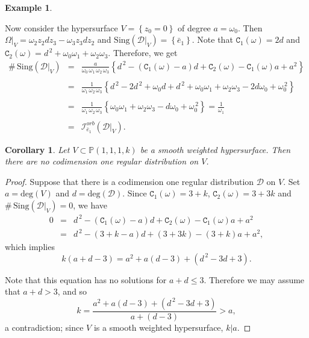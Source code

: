 \documentclass[11pt]{amsart}
\theoremstyle{plain}
\newtheorem{cor}{Corollary}[section]
\theoremstyle{definition}
\newtheorem{exe}{Example}[section]
\begin{document}
\begin{exe}
\begin{enumerate}
Now consider the hypersurface $V=\left\{z_0=0\right\}$ of degree $a=\omega_0$. 
Then $\Omega|_V=\omega_2z_2dz_3-\omega_3z_3dz_2$ and $\mathrm{Sing}(\mathcal{D}|_V)=\left\{\bar{e}_1\right\}$.
Note that $\texttt{C}_1(\omega)=2d$ and $\texttt{C}_2(\omega)=d^{\,2}+\omega_0\omega_1+\omega_2\omega_3$.
Therefore, we get
\begin{eqnarray*}
\#\,\mathrm{Sing}(\mathcal{D}|_V)&=&\frac{a}{\omega_0\,\omega_1\,\omega_2\,\omega_3}
\left\{d^{\,2}-(\texttt{C}_1(\omega)-a)d+\texttt{C}_2(\omega)-\texttt{C}_1(\omega)a+a^2\right\} \\ \\
&=& \frac{1}{\omega_1\,\omega_2\,\omega_3}\left\{d^{\,2}-2d^{\,2}+\omega_0d+d^{\,2}+\omega_0\omega_1+\omega_2\omega_3
-2d\omega_0+\omega_0^{\,2}\right\} \\ \\
&=& \frac{1}{\omega_1\,\omega_2\,\omega_3}\left\{\omega_0\omega_1+\omega_2\omega_3-d\omega_0+\omega_0^{\,2}\right\}
=\frac{1}{\omega_1} \\ \\
&=& \mathcal{I}_{\bar{e}_1}^{orb}\left(\mathcal{D}|_V\right).
\end{eqnarray*}
\end{enumerate}
\end{exe}

\vspace{0,1cm}

\begin{cor} \label{coror}
Let $V\subset\mathbb{P}(1,1,1,k)$ be a smooth weighted hypersurface.
Then there are no codimension one regular distribution on $V$.
\end{cor}

\begin{proof} Suppose that there is a codimension one regular distribution $\mathcal{D}$ on $V$.
Set $a=\mathrm{deg}(V)$ and $d=\mathrm{deg}(\mathcal{D})$. Since $\texttt{C}_1(\omega)=3+k$, 
$\texttt{C}_2(\omega)=3+3k$ and $\#\,\mathrm{Sing}(\mathcal{D}|_V)=0$, we have
\begin{eqnarray*}
0&=&d^{\,2}-(\texttt{C}_1(\omega)-a)d+\texttt{C}_2(\omega)-\texttt{C}_1(\omega)a+a^2 \\
&=&d^{\,2}-(3+k-a)d+(3+3k)-(3+k)a+a^2,
\end{eqnarray*}
which implies 
$$k\left(a+d-3\right)=a^2+a(d-3)+(d^{\,2}-3d+3).$$ 

Note that this equation has no solutions for $a+d\leq3$.
Therefore we may assume that $a+d>3$, and so
$$k=\frac{a^2+a(d-3)+(d^{\,2}-3d+3)}{a+(d-3)}>a,$$ 
a contradiction; since $V$ is a smooth weighted hypersurface, $k|a$. %
\end{proof}
\end{document}

